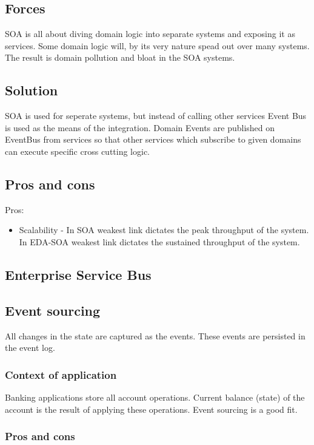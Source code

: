 \documentclass[12pt, a4paper]{article}
\begin{document}
\subsection{Forces}
SOA is all about diving domain logic into separate systems and exposing it as services. Some domain logic will, by its very nature spead out over many systems. The result is domain pollution and bloat in the SOA systems.

\subsection{Solution}
SOA is used for seperate systems, but instead of calling other services Event Bus is used as the means of the integration. Domain Events are published on EventBus from services so that other services which subscribe to given domains can execute specific cross cutting logic.

\subsection{Pros and cons}
Pros:
\begin{itemize}
  \item Scalability - In SOA weakest link dictates the peak throughput of the system. In EDA-SOA weakest link dictates the sustained throughput of the system. 
\end{itemize}


\subsection{Enterprise Service Bus}


\subsection{Event sourcing}
All changes in the state are captured as the events. These events are persisted in the event log.

\subsubsection{Context of application}
Banking applications store all account operations. Current balance (state) of the account is the result of applying these operations. Event sourcing is a good fit.

\subsubsection{Pros and cons}
\end{document}
